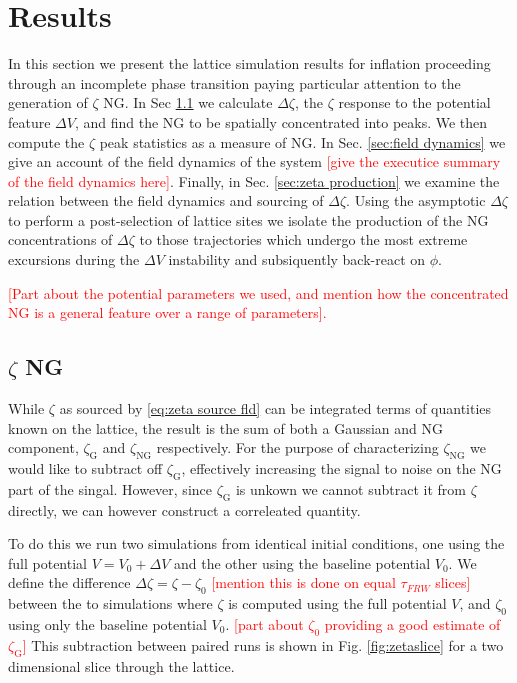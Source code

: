 
\section{Results} \label{sec:results}

In this section we present the lattice simulation results for inflation proceeding through an incomplete phase transition paying particular attention to the generation of $\zeta$ NG. In Sec \ref{sec:zeta ng} we calculate $\Delta\zeta$, the $\zeta$ response to the potential feature $\Delta V$, and find the NG to be spatially concentrated into peaks. We then compute the $\zeta$ peak statistics as a measure of NG. In Sec. \ref{sec:field dynamics} we give an account of the field dynamics of the system \textcolor{red}{[give the executice summary of the field dynamics here]}. Finally, in Sec. \ref{sec:zeta production} we examine the relation between the field dynamics and sourcing of $\Delta\zeta$. Using the asymptotic $\Delta\zeta$ to perform a post-selection of lattice sites we isolate the production of the NG concentrations of $\Delta\zeta$ to those trajectories which undergo the most extreme excursions during the $\Delta V$ instability and subsiquently back-react on $\phi$.

\textcolor{red}{[Part about the potential parameters we used, and mention how the concentrated NG is a general feature over a range of parameters].}

\subsection{$\zeta$ NG} \label{sec:zeta ng}
While $\zeta$ as sourced by \eqref{eq:zeta source fld} can be integrated terms of quantities known on the lattice, the result is the sum of both a Gaussian and NG component, $\zeta_\mathrm{G}$ and $\zeta_\mathrm{NG}$ respectively. For the purpose of characterizing $\zeta_\mathrm{NG}$ we would like to subtract off $\zeta_\mathrm{G}$, effectively increasing the signal to noise on the NG part of the singal. However, since $\zeta_\mathrm{G}$ is unkown we cannot subtract it from $\zeta$ directly, we can however construct a correleated quantity.

To do this we run two simulations from identical initial conditions, one using the full potential $V=V_0+\Delta V$ and the other using the baseline potential $V_0$. We define the difference $\Delta\zeta=\zeta-\zeta_0$ \textcolor{red}{[mention this is done on equal $\tau_{FRW}$ slices]} between the to simulations where $\zeta$ is computed using the full potential $V$, and $\zeta_0$ using only the baseline potential $V_0$. \textcolor{red}{[part about $\zeta_0$ providing a good estimate of $\zeta_\mathrm{G}$]} This subtraction between paired runs is shown in Fig. \ref{fig:zetaslice} for a two dimensional slice through the lattice.

